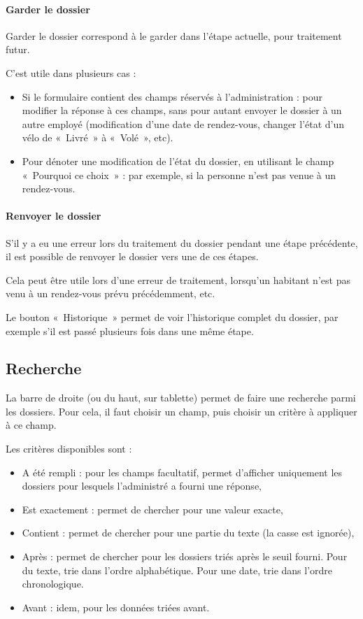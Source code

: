 \documentclass[11pt,french]{memoir}
\begin{document}
	\paragraph{Garder le dossier}
	Garder le dossier correspond à le garder dans l'étape actuelle, pour traitement futur.

	C'est utile dans plusieurs cas :
	\begin{itemize}
		\item Si le formulaire contient des champs réservés à l'administration : pour modifier la réponse à ces champs, sans pour autant envoyer le dossier à un autre employé (modification d'une date de rendez-vous, changer l'état d'un vélo de «~Livré~» à «~Volé~», etc).
		\item Pour dénoter une modification de l'état du dossier, en utilisant le champ «~Pourquoi ce choix~» : par exemple, si la personne n'est pas venue à un rendez-vous.
	\end{itemize}

	\paragraph{Renvoyer le dossier}
	S'il y a eu une erreur lors du traitement du dossier pendant une étape précédente, il est possible de renvoyer le dossier vers une de ces étapes.

	Cela peut être utile lors d'une erreur de traitement, lorsqu'un habitant n'est pas venu à un rendez-vous prévu précédemment, etc.

	\uparagraph
	Le bouton «~Historique~» permet de voir l'historique complet du dossier, par exemple s'il est passé plusieurs fois dans une même étape.

	\subsection{Recherche}\label{subsec:recherche}

	La barre de droite (ou du haut, sur tablette) permet de faire une recherche parmi les dossiers.
	Pour cela, il faut choisir un champ, puis choisir un critère à appliquer à ce champ.

	Les critères disponibles sont :
	\begin{itemize}
		\item A été rempli : pour les champs facultatif, permet d'afficher uniquement les dossiers pour lesquels l'administré a fourni une réponse,
		\item Est exactement : permet de chercher pour une valeur exacte,
		\item Contient : permet de chercher pour une partie du texte (la casse est ignorée),
		\item Après : permet de chercher pour les dossiers triés après le seuil fourni.
		Pour du texte, trie dans l'ordre alphabétique.
		Pour une date, trie dans l'ordre chronologique.
		\item Avant : idem, pour les données triées avant.
	\end{itemize}
\end{document}
